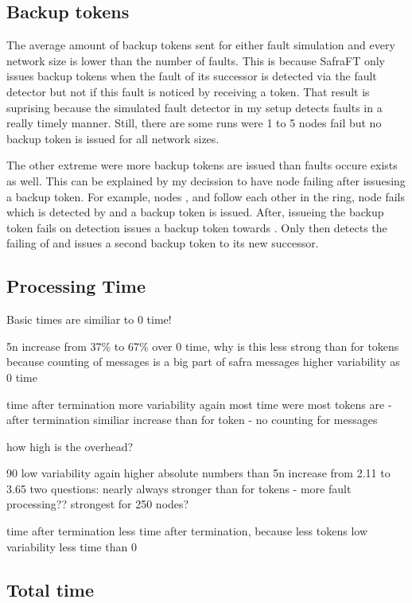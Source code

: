 \subsection{Backup tokens}
The average amount of backup tokens sent for either fault simulation and every network size is lower than the number of faults.
This is because SafraFT only issues backup tokens when the fault of its successor is detected via the fault detector but not if this fault is noticed by receiving a token.
That result is suprising because the simulated fault detector in my setup detects faults in a really timely manner.
Still, there are some runs were 1 to 5 nodes fail but no backup token is issued for all network sizes. 

The other extreme were more backup tokens are issued than faults occure exists as well.
This can be explained by my decission to have node failing after issuesing a backup token.
For example, nodes ,  and  follow each other in the ring, node  fails which is detected by  and a backup token is issued.
After, issueing the backup token  fails on detection  issues a backup token towards .
Only then  detects the failing of  and issues a second backup token to its new successor.  


\subsection{Processing Time}

Basic times are similiar to 0 time!

5n
 increase from 37\% to 67\% over 0 time, why is this less strong than for tokens because counting of messages is a big part of safra messages
 higher variability as 0 time
 
 time after termination
   more variability
   again most time were most tokens are - after termination
   similiar increase than for token - no counting for messages
   
 how high is the overhead?
 
90
 low variability again
 higher absolute numbers than 5n
 increase from 2.11 to 3.65
   two questions:
     nearly always stronger than for tokens - more fault processing??
     strongest for 250 nodes?
   
  time after termination
    less time after termination, because less tokens
    low variability
    less time than 0
    
 \subsection{Total time}
 
